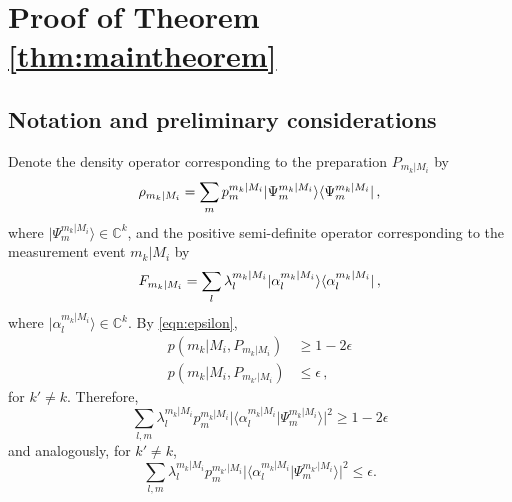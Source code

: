 \chapter{Proof of Theorem \ref{thm:maintheorem}}
\label{sec:appendix}

\section{Notation and preliminary considerations}
Denote the density operator corresponding to the preparation $P_{m_k\vert M_i}$ by 
\begin{equation}
\label{eqn:densityop}
\rho_{m_k\vert M_i} = \sum_m p_m^{m_k\vert M_i} \vert \Psi_m^{m_k\vert M_i}\rangle\langle \Psi_m^{m_k\vert M_i} \vert\thinspace ,
\end{equation} where $\vert \Psi_m^{m_k\vert M_i} \rangle \in \mathbb{C}^k$, and the positive semi-definite operator corresponding to the measurement event $m_k\vert M_i$ by
\begin{equation}
\label{eqn:mntop}
F_{m_k\vert M_i}=\sum_l \lambda_l^{m_k\vert M_i} \vert \alpha_l^{m_k\vert M_i}\rangle \langle \alpha_l^{m_k\vert M_i} \vert\thinspace ,
\end{equation} where $\vert \alpha_l^{m_k\vert M_i} \rangle \in \mathbb{C}^k$.
By \ref{eqn:epsilon},
\begin{align*}
p(m_k\vert M_i, P_{m_k\vert M_i}) & \geq 1-2\epsilon \\
p(m_k\vert M_i, P_{m_{k'}\vert M_i}) & \leq \epsilon\, ,
\end{align*}
for $k'\neq k$.
Therefore,
\begin{equation}
\label{eqn:cond1}
\sum_{l,m}\lambda_l^{m_k\vert M_i}p_m^{m_k\vert M_i}\vert \langle \alpha_l^{m_k\vert M_i} \vert \Psi_m^{m_k\vert M_i} \rangle \vert^2 \geq 1-2\epsilon
\end{equation}
and analogously, for $k'\neq k$,
\begin{equation}
\label{eqn:cond2}
\sum_{l,m}\lambda_l^{m_k\vert M_i}p_m^{m_{k'}\vert M_i}\vert \langle \alpha_l^{m_k\vert M_i} \vert \Psi_m^{m_{k'}\vert M_i} \rangle \vert^2 \leq \epsilon.
\end{equation}


